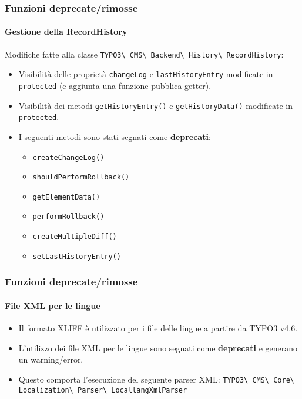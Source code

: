 
\begin{frame}[fragile]
	\frametitle{Funzioni deprecate/rimosse}
	\framesubtitle{Gestione della RecordHistory}

	Modifiche fatte alla classe
		\smaller
			\texttt{TYPO3\textbackslash
				CMS\textbackslash
				Backend\textbackslash
				History\textbackslash
				RecordHistory}:
		\normalsize

	\begin{itemize}

		\item Visibilità delle proprietà \texttt{changeLog} e \texttt{lastHistoryEntry}
			modificate in \texttt{protected} (e aggiunta una funzione pubblica getter).
		\item Visibilità dei metodi \texttt{getHistoryEntry()} e \texttt{getHistoryData()}
			modificate in \texttt{protected}.
		\item I seguenti metodi sono stati segnati come \textbf{deprecati}:

			\begin{itemize}\smaller
				\item \texttt{createChangeLog()}
				\item \texttt{shouldPerformRollback()}
				\item \texttt{getElementData()}
				\item \texttt{performRollback()}
				\item \texttt{createMultipleDiff()}
				\item \texttt{setLastHistoryEntry()}
			\end{itemize}\normalsize

	\end{itemize}

\end{frame}


\begin{frame}[fragile]
	\frametitle{Funzioni deprecate/rimosse}
	\framesubtitle{File XML per le lingue}

	\begin{itemize}
		\item Il formato XLIFF è utilizzato per i file delle lingue a partire da TYPO3 v4.6.
		\item L'utilizzo dei file XML per le lingue sono segnati come \textbf{deprecati}
			e generano un warning/error.
		\item Questo comporta l'esecuzione del seguente parser XML:\newline
			\small
				\texttt{TYPO3\textbackslash
					CMS\textbackslash
					Core\textbackslash
					Localization\textbackslash
					Parser\textbackslash
					LocallangXmlParser}
			\normalsize
	\end{itemize}

\end{frame}


